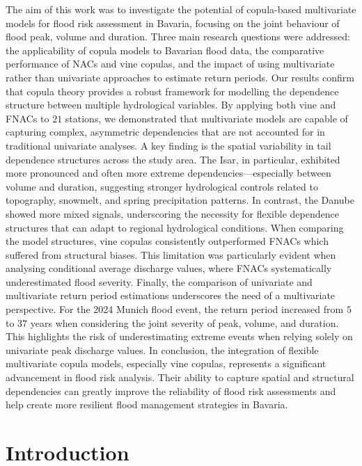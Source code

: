 \documentclass[
]{krantz}
\begin{document}
The aim of this work was to investigate the potential of copula-based multivariate models for flood risk assessment in Bavaria, focusing on the joint behaviour of flood peak, volume and duration.
Three main research questions were addressed: the applicability of copula models to Bavarian flood data, the comparative performance of NACs and vine copulas, and the impact of using multivariate rather than univariate approaches to estimate return periods.
Our results confirm that copula theory provides a robust framework for modelling the dependence structure between multiple hydrological variables. By applying both vine and FNACs to \(21\) stations, we demonstrated that multivariate models are capable of capturing complex, asymmetric dependencies that are not accounted for in traditional univariate analyses.
A key finding is the spatial variability in tail dependence structures across the study area. The Isar, in particular, exhibited more pronounced and often more extreme dependencies---especially between volume and duration, suggesting stronger hydrological controls related to topography, snowmelt, and spring precipitation patterns.
In contrast, the Danube showed more mixed signals, underscoring the necessity for flexible dependence structures that can adapt to regional hydrological conditions.
When comparing the model structures, vine copulas consistently outperformed FNACs which suffered from structural biases. This limitation was particularly evident when analysing conditional average discharge values, where FNACs systematically underestimated flood severity.
Finally, the comparison of univariate and multivariate return period estimations underscores the need of a multivariate perspective.
For the 2024 Munich flood event, the return period increased from \(5\) to \(37\) years when considering the joint severity of peak, volume, and duration. This highlights the risk of underestimating extreme events when relying solely on univariate peak discharge values.
In conclusion, the integration of flexible multivariate copula models, especially vine copulas, represents a significant advancement in flood risk analysis. Their ability to capture spatial and structural dependencies can greatly improve the reliability of flood risk assessments and help create more resilient flood management strategies in Bavaria.

\chapter{Introduction}\label{introduction-1}
\end{document}
